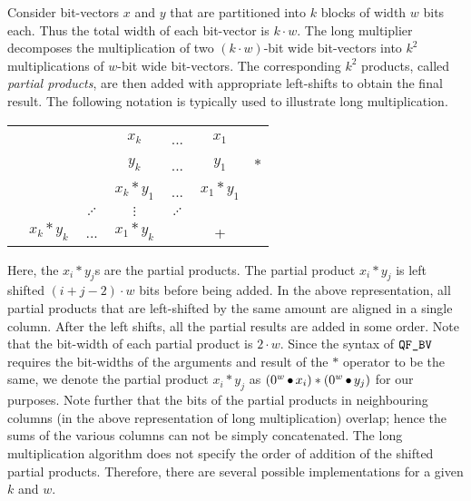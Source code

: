 Consider bit-vectors $x$ and $y$ that are partitioned into $k$ blocks of width $w$ bits each. Thus the total width of each bit-vector is $k \cdot w$. 
The long multiplier decomposes the multiplication of two $(k\cdot w)$-bit wide bit-vectors into $k^2$ multiplications of $w$-bit wide bit-vectors. The corresponding $k^2$ products, called {\em partial products}, are then added with appropriate left-shifts to obtain the final
result. 
%
%
The following notation is typically used to illustrate
long multiplication.
%
\begin{center}
\begin{tabular}{c@{\quad}c@{\quad}c@{\quad}c@{\quad}c@{\quad}c@{\quad}c}
  &&& $x_{k}$ & ... & $x_1$&\\ 
  &&& $y_{k}$ & ... & $y_1$&$*$\\ \hline\vspace{-2pt}
  &&&$x_k*y_1$& ... & $x_1*y_1$&\\\vspace{-2pt}
  &&$\iddots$&$\vdots$& $\iddots$ && \\
  &$x_k*y_k$& ... &$x_1*y_k$&  & +&\\\hline
\end{tabular}  
\end{center}
Here, the $x_i*y_j$s are the partial products. The partial product $x_i*y_j$ is left shifted $(i+j-2) \cdot w$ bits before being added. In the above representation, all partial
products that are left-shifted by the same amount are aligned in a single column.
After the left shifts, all the partial results are added in some order. 
%
%
%
Note that the bit-width of each partial product is $2 \cdot w$.
%
Since the syntax of $\texttt{QF\_BV}$ requires the bit-widths of the arguments
and result of the $*$ operator to be the same, we denote the partial
product $x_i * y_j$ as $(0^w \mathop{\bullet} x_i)*(0^w \mathop{\bullet} y_j)$ for our
purposes. Note further that the bits of the partial products in
neighbouring columns (in the above representation of long
multiplication) overlap; hence the sums of the various columns can not
be simply concatenated. The long multiplication algorithm does not
specify the order of addition of the shifted partial
products. Therefore, there are several possible implementations for a
given $k$ and $w$.

